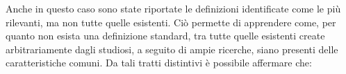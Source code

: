 Anche in questo caso sono state riportate le definizioni identificate come le più rilevanti, ma non tutte quelle esistenti. Ciò permette di apprendere come, per quanto non esista una definizione standard, tra tutte quelle esistenti create arbitrariamente dagli studiosi, a seguito di ampie ricerche, siano presenti delle caratteristiche comuni. Da tali tratti distintivi è possibile affermare che:

